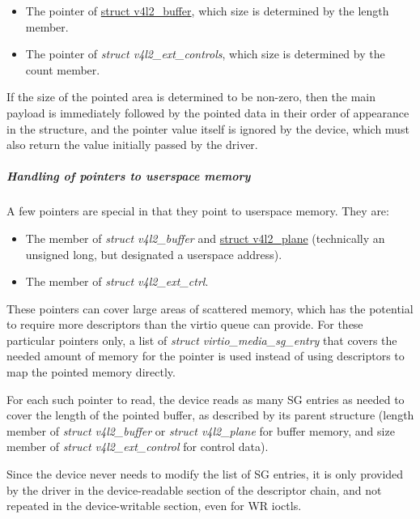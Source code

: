 \begin{itemize}
\item The  pointer of
\href{https://www.kernel.org/doc/html/latest/userspace-api/media/v4l/buffer.html#struct-v4l2-buffer}{struct v4l2_buffer},
which size is determined by the length member.
\item The  pointer of \textit{struct v4l2_ext_controls}, which
size is determined by the count member.
\end{itemize}

If the size of the pointed area is determined to be non-zero, then the main
payload is immediately followed by the pointed data in their order of
appearance in the structure, and the pointer value itself is ignored by the
device, which must also return the value initially passed by the driver.

\subparagraph{Handling of pointers to userspace memory}

A few pointers are special in that they point to userspace memory. They are:

\begin{itemize}
\item The  member of \textit{struct v4l2_buffer} and
\href{https://www.kernel.org/doc/html/latest/userspace-api/media/v4l/buffer.html#struct-v4l2-plane}{struct v4l2_plane}
(technically an unsigned long, but designated a userspace address).
\item The  member of \textit{struct v4l2_ext_ctrl}.
\end{itemize}

These pointers can cover large areas of scattered memory, which has the
potential to require more descriptors than the virtio queue can provide. For
these particular pointers only, a list of \textit{struct virtio_media_sg_entry}
that covers the needed amount of memory for the pointer is used instead of
using descriptors to map the pointed memory directly.

For each such pointer to read, the device reads as many SG entries as needed
to cover the length of the pointed buffer, as described by its parent
structure (length member of \textit{struct v4l2_buffer} or
\textit{struct v4l2_plane} for buffer memory, and size member of
\textit{struct v4l2_ext_control} for control data).

Since the device never needs to modify the list of SG entries, it is only
provided by the driver in the device-readable section of the descriptor chain,
and not repeated in the device-writable section, even for WR ioctls.

